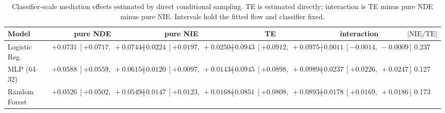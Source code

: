 \begin{table}[htbp]
  \centering
  \caption{Classifier-scale mediation effects estimated by direct conditional sampling. TE is estimated directly; interaction is TE minus pure NDE minus pure NIE. Intervals hold the fitted flow and classifier fixed.}
  \label{tab:acs_gap_overall}
  \begin{tabular}{lccccc}
    \toprule
    Model & pure NDE & pure NIE & TE & interaction & $|\mathrm{NIE}/\mathrm{TE}|$ \\
    \midrule
    Logistic Reg. & $+0.0731\ [+0.0717,\ +0.0744]$ & $+0.0224\ [+0.0197,\ +0.0250]$ & $+0.0943\ [+0.0912,\ +0.0975]$ & $-0.0011\ [-0.0014,\ -0.0009]$ & 0.237 \\
    MLP (64--32) & $+0.0588\ [+0.0559,\ +0.0615]$ & $+0.0120\ [+0.0097,\ +0.0143]$ & $+0.0945\ [+0.0898,\ +0.0989]$ & $+0.0237\ [+0.0226,\ +0.0247]$ & 0.127 \\
    Random Forest & $+0.0526\ [+0.0502,\ +0.0549]$ & $+0.0147\ [+0.0123,\ +0.0168]$ & $+0.0851\ [+0.0808,\ +0.0893]$ & $+0.0178\ [+0.0169,\ +0.0186]$ & 0.173 \\
    \bottomrule
  \end{tabular}
\end{table}